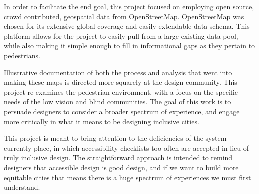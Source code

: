 In order to facilitate the end goal, this project focused on employing open source, crowd contributed, geospatial data from OpenStreetMap. OpenStreetMap was chosen for its extensive global coverage and easily extendable data schema. This platform allows for the project to easily pull from a large existing data pool, while also making it simple enough to fill in informational gaps as they pertain to pedestrians.

Illustrative documentation of both the process and analysis that went into making these maps is directed more squarely at the design community. This project re-examines the pedestrian environment, with a focus on the specific needs of the low vision and blind communities. The goal of this work is to persuade designers to consider a broader spectrum of experience, and engage more critically in what it means to be designing inclusive cities.  

This project is meant to bring attention to the deficiencies of the system currently place, in which accessibility checklists too often are accepted in lieu of truly inclusive design.  The straightforward approach is intended to remind designers that accessible design is good design, and if we want to build more equitable cities that means there is a huge spectrum of experiences we must first understand. 
